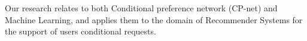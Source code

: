 \label{sec_Relwork}
%

Our research relates to both Conditional preference network (CP-net) and Machine Learning, and applies them to the domain of Recommender Systems for the support of users conditional requests.
%